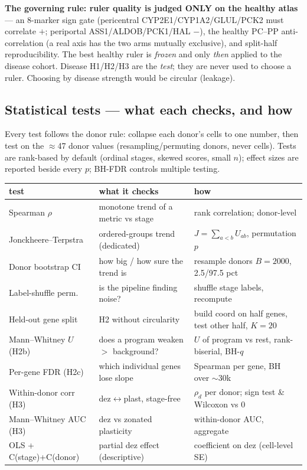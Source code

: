 \documentclass[11pt]{article}
\begin{document}
\textbf{The governing rule: ruler quality is judged ONLY on the healthy atlas} --- an 8-marker
sign gate (pericentral CYP2E1/CYP1A2/GLUL/PCK2 must correlate $+$; periportal ASS1/ALDOB/PCK1/HAL
$-$), the healthy PC--PP anti-correlation (a real axis has the two arms mutually exclusive), and
split-half reproducibility. The best healthy ruler is \emph{frozen} and only \emph{then} applied to
the disease cohort. Disease H1/H2/H3 are the \emph{test}; they are never used to choose a ruler.
Choosing by disease strength would be circular (leakage).

\subsection{Statistical tests --- what each checks, and how}
Every test follows the donor rule: collapse each donor's cells to one number, then test on the
$\approx$47 donor values (resampling/permuting donors, never cells). Tests are rank-based by default
(ordinal stages, skewed scores, small $n$); effect sizes are reported beside every $p$; BH-FDR
controls multiple testing.

\begin{tabular}{l l l}
\hline
test & what it checks & how \\
\hline
Spearman $\rho$ & monotone trend of a metric vs stage & rank correlation; donor-level \\
Jonckheere--Terpstra & ordered-groups trend (dedicated) & $J=\sum_{a<b}U_{ab}$, permutation $p$ \\
Donor bootstrap CI & how big / how sure the trend is & resample donors $B{=}2000$, 2.5/97.5 pct \\
Label-shuffle perm. & is the pipeline finding noise? & shuffle stage labels, recompute \\
Held-out gene split & H2 without circularity & build coord on half genes, test other half, $K{=}20$ \\
Mann--Whitney $U$ (H2b) & does a program weaken $>$ background? & $U$ of program vs rest, rank-biserial, BH-$q$ \\
Per-gene FDR (H2c) & which individual genes lose slope & Spearman per gene, BH over $\sim$30k \\
Within-donor corr (H3) & dez$\leftrightarrow$plast, stage-free & $\rho_d$ per donor; sign test \& Wilcoxon vs 0 \\
Mann--Whitney AUC (H3) & dez vs zonated plasticity & within-donor AUC, aggregate \\
OLS + C(stage)+C(donor) & partial dez effect (descriptive) & coefficient on dez (cell-level SE) \\
\hline
\end{tabular}
\end{document}

